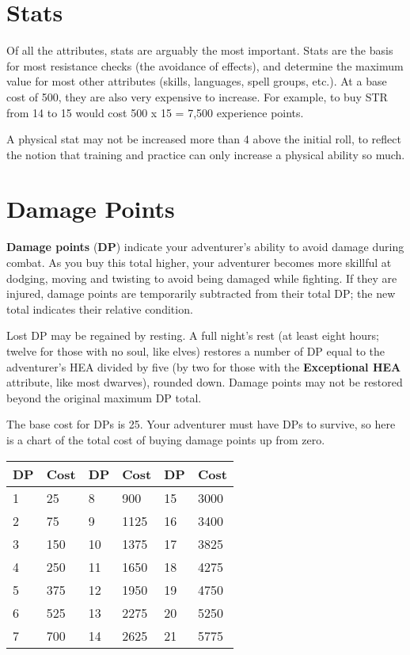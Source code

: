 \begin{multicols*}{2}
\section{Stats}
Of all the attributes, stats are arguably the most important. Stats are the basis for most resistance checks (the avoidance of effects), and determine the maximum value for most other attributes (skills, languages, spell groups, etc.). At a base cost of 500, they are also very expensive to increase. For example, to buy STR from 14 to 15 would cost 500 x 15 = 7,500 experience points.

A physical stat may not be increased more than 4 above the initial roll, to reflect the notion that training and practice can only increase a physical ability so much.
\section{Damage Points}
\textbf{Damage points} (\textbf{DP}) indicate your adventurer's ability to avoid damage during combat. As you buy this total higher, your adventurer becomes more skillful at dodging, moving and twisting to avoid being damaged while fighting. If they are injured, damage points are temporarily subtracted from their total DP; the new total indicates their relative condition.

Lost DP may be regained by resting. A full night's rest (at least eight hours; twelve for those with no soul, like elves) restores a number of DP equal to the adventurer's HEA divided by five (by two for those with the \textbf{Exceptional HEA} attribute, like most dwarves), rounded down. Damage points may not be restored beyond the original maximum DP total.

The base cost for DPs is 25. Your adventurer must have DPs to survive, so here is a chart of the total cost of buying damage points up from zero.

\begin{tcolorbox}[breakable,boxrule=0pt,title=\textbf{Buying Damage Points}]
\begin{tabular}{l l|l l|l l}
DP & Cost & DP & Cost & DP & Cost\\
\midrule
1 & 25 & 8 & 900 & 15 & 3000\\
2 & 75 & 9 & 1125 & 16 & 3400\\
3 & 150 & 10 & 1375 & 17 & 3825\\
4 & 250 & 11 & 1650 & 18 & 4275\\
5 & 375 & 12 & 1950 & 19 & 4750\\
6 & 525 & 13 & 2275 & 20 & 5250\\
7 & 700 & 14 & 2625 & 21 & 5775\\
\end{tabular}
\end{tcolorbox}


\end{multicols*}
